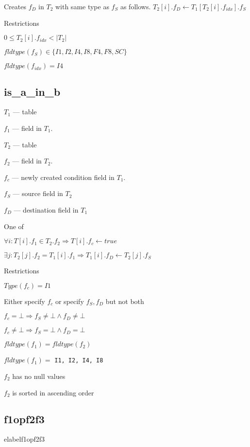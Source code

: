 \documentclass{report}
\begin{document}
Creates \(f_D\) in \(T_2\) with same type as \(f_S\) as follows.
\(T_2[i].f_D \leftarrow T_1[T_2[i].f_{idx}].f_S\)

Restrictions
\be
\item \(0 \leq T_2[i].f_{idx} < |T_2|\)
\item \(fldtype(f_S) \in \{ I1, I2, I4, I8, F4, F8, SC\}\)
\item \(fldtype(f_{idx}) = I4\)
\ee


\subsection{is\_a\_in\_b}
\label{is_a_in_b}

\be
\item \(T_1\) --- table
\item \(f_1\) --- field in \(T_1\). 
\item \(T_2\) --- table
\item \(f_2\) --- field in \(T_2\). 
\item \(f_c\) --- newly created condition field in \(T_1\). 
\item \(f_S\) --- source field in \(T_2\)
\item \(f_D\) --- destination field in \(T_1\)
\ee

One of 
\be
\item 
\(\forall i: T[i].f_1 \in T_2.f_2 \Rightarrow T[i].f_c \leftarrow true\)
\item \(\exists j: T_2[j].f_2 = T_1[i].f_1 \Rightarrow T_1[i].f_D
\leftarrow T_2[j].f_S\)
\ee

Restrictions
\be
\item \(Type(f_c) = I1\)
\item Either specify \(f_c\) or specify \(f_S, f_D\) but not both
\be
\item \(f_c = \bot \Rightarrow f_S \neq \bot \wedge f_D \neq \bot\)
\item \(f_c \neq \bot \Rightarrow f_S = \bot \wedge f_D = \bot\)
\ee
\item \(fldtype(f_1) = fldtype(f_2)\)
\item \(fldtype(f_1) = \) {\tt I1, I2, I4, I8}
\item \(f_2\) has no null values
\item \(f_2\) is sorted in ascending order
\ee

\subsection{f1opf2f3}
elabel{f1opf2f3}
\end{document}
